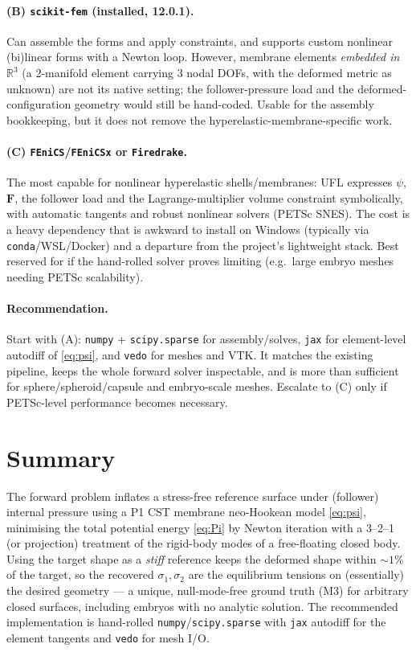 \documentclass[11pt]{article}
\newcommand{\vv}[1]{\bm{#1}}          %
\newcommand{\FF}{\vv{F}}               %
\newcommand{\R}{\mathbb{R}}
\begin{document}
\paragraph{(B) \texttt{scikit-fem} (installed, 12.0.1).} Can assemble the forms and apply
constraints, and supports custom nonlinear (bi)linear forms with a Newton loop. However,
membrane elements \emph{embedded in} $\R^3$ (a 2-manifold element carrying 3 nodal DOFs,
with the deformed metric as unknown) are not its native setting; the follower-pressure
load and the deformed-configuration geometry would still be hand-coded. Usable for the
assembly bookkeeping, but it does not remove the hyperelastic-membrane-specific work.

\paragraph{(C) \texttt{FEniCS}/\texttt{FEniCSx} or \texttt{Firedrake}.} The most capable
for nonlinear hyperelastic shells/membranes: UFL expresses $\psi$, $\FF$, the follower
load and the Lagrange-multiplier volume constraint symbolically, with automatic tangents
and robust nonlinear solvers (PETSc SNES). The cost is a heavy dependency that is awkward
to install on Windows (typically via \texttt{conda}/WSL/Docker) and a departure from the
project's lightweight stack. Best reserved for if the hand-rolled solver proves limiting
(e.g.\ large embryo meshes needing PETSc scalability).

\paragraph{Recommendation.} Start with (A): \texttt{numpy} + \texttt{scipy.sparse} for
assembly/solves, \texttt{jax} for element-level autodiff of \eqref{eq:psi}, and
\texttt{vedo} for meshes and VTK. It matches the existing pipeline, keeps the whole
forward solver inspectable, and is more than sufficient for sphere/spheroid/capsule and
embryo-scale meshes. Escalate to (C) only if PETSc-level performance becomes necessary.

\section*{Summary}
The forward problem inflates a stress-free reference surface under (follower) internal
pressure using a P1 CST membrane neo-Hookean model \eqref{eq:psi}, minimising the total
potential energy \eqref{eq:Pi} by Newton iteration with a 3--2--1 (or projection)
treatment of the rigid-body modes of a free-floating closed body. Using the target shape
as a \emph{stiff} reference keeps the deformed shape within $\sim1\%$ of the target, so
the recovered $\sigma_1,\sigma_2$ are the equilibrium tensions on (essentially) the
desired geometry --- a unique, null-mode-free ground truth (M3) for arbitrary closed
surfaces, including embryos with no analytic solution. The recommended implementation is
hand-rolled \texttt{numpy}/\texttt{scipy.sparse} with \texttt{jax} autodiff for the
element tangents and \texttt{vedo} for mesh I/O.
\end{document}
